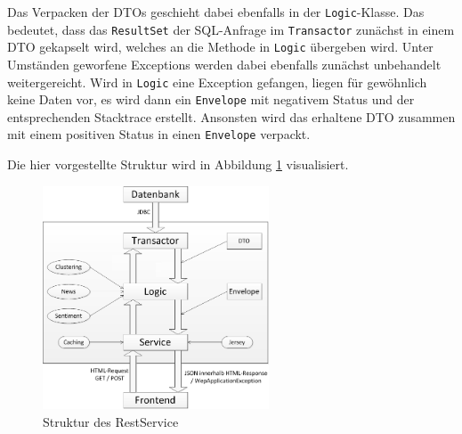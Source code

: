 Das Verpacken der DTOs geschieht dabei ebenfalls in der \texttt{Logic}-Klasse. Das bedeutet, dass das \texttt{ResultSet} der SQL-Anfrage im \texttt{Transactor} zunächst in einem DTO gekapselt wird, welches an die Methode in \texttt{Logic} übergeben wird. Unter Umständen geworfene Exceptions werden dabei ebenfalls zunächst unbehandelt weitergereicht. Wird in \texttt{Logic} eine Exception gefangen, liegen für gewöhnlich keine Daten vor, es wird dann ein \texttt{Envelope} mit negativem Status und der entsprechenden Stacktrace erstellt. Ansonsten wird das erhaltene DTO zusammen mit einem positiven Status in einen \texttt{Envelope} verpackt.

Die hier vorgestellte Struktur wird in Abbildung \ref{fig:reststruktur} visualisiert.

\begin{figure}[h]
\centering
\includegraphics[width=0.6\textwidth]{Bilder/REST/RestServiceZeichnung.png}
\caption{Struktur des RestService}
\label{fig:reststruktur}
\end{figure}